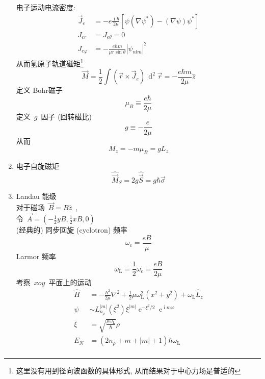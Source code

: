 \documentclass[11pt,a4paper,twocolumn,fleqn]{article}%
\DeclareMathOperator{\diff}{\, d}
\DeclareMathOperator{\mi}{i}
\DeclareMathOperator{\e}{e}%
\renewcommand{\[}{~$}
\renewcommand{\]}{$~}%
\begin{document}
\begin{enumerate}
  	电子运动电流密度:
  	\begin{align}
  	 \vec J_e &= -e\frac{\mi \hbar}{2\mu}[\psi(\nabla\psi^*) - (\nabla \psi)\psi^*] \\
  	 J_{er} &= J_{e\theta} = 0 \\
  	 J_{e\varphi} &= -\frac{e\hbar m}{\mu r\sin\theta}|\psi_{nlm}|^2
  	\end{align}
  	从而氢原子轨道磁矩\footnote{这里没有用到径向波函数的具体形式, 从而结果对于中心力场是普适的}
  	\begin{equation}
  	 \vec M = \frac{1}{2}\int (\vec r \times \vec J_e)\diff^2\vec r = -\frac{e\hbar m}{2\mu}\hat z
  	\end{equation}
  	定义 Bohr磁子
  	\begin{equation}
  	 \mu_B \equiv \frac{e\hbar}{2\mu}
  	\end{equation}
  	定义\[g\]因子 (回转磁比)
  	\begin{equation}
  	 g \equiv -\frac{e}{2\mu}
  	\end{equation}
  	从而
  	\begin{equation}
  	 M_z = -m\mu_B = gL_z
  	\end{equation}
  \item 电子自旋磁矩
  	\begin{equation}
  	 \hat{\vec{M}}_S = 2g\hat{\vec S} = g\hbar\vec\sigma
  	\end{equation}
  \item Landau 能级\\
  	对于磁场\[\vec B = B \hat z\], \\
  	令\[\vec A = \left(-\frac{1}{2}yB,\frac{1}{2}xB,0\right)\]\\
  	(经典的) 同步回旋 (cyclotron) 频率
  	\begin{equation}
  	 \omega_{\mathrm c} = \frac{eB}{\mu}
  	\end{equation}
  	Larmor 频率
  	\begin{equation}
  	 \omega_{\mathrm L} = \frac{1}{2}\omega_{\mathrm c} = \frac{eB}{2\mu}
  	\end{equation}
  	考察\[xoy\]平面上的运动
  	\begin{align}
  	 \hat H &= -\frac{\hbar^2}{2\mu}\nabla^2 + \frac{1}{2}\mu\omega_{\mathrm L}^2(x^2+y^2)+\omega_{\mathrm L}\hat L_z \\
  	 \psi &\sim L_{n_\rho}^{|m|}(\xi^2)\xi^{|m|}\e^{-\xi^2/2}\e^{\mi m \varphi} \\
  	 \xi &= \sqrt{\frac{\mu\omega_{\mathrm L}}{\hbar}}\rho \\
  	 E_N &= (2n_\rho + m + |m| + 1)\hbar\omega_{\mathrm L} \nonumber \\

\end{align}
\end{enumerate}
\end{document}
